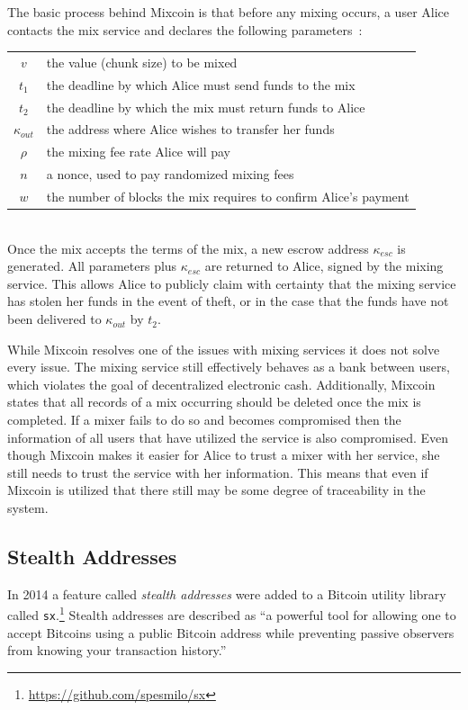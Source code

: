 \documentclass[11pt]{article}
\begin{document}
The basic process behind Mixcoin is that before any mixing occurs, a user Alice contacts the mix service and declares
the following parameters~\cite{bonneau14}:\\
\begin{tabular}{cl}
    $v$ & the value (chunk size) to be mixed\\
    $t_1$ & the deadline by which Alice must send funds to the mix\\
    $t_2$ & the deadline by which the mix must return funds to Alice\\
    $\kappa_{out}$ & the address where Alice wishes to transfer her funds\\
    $\rho$ & the mixing fee rate Alice will pay\\
    $n$ & a nonce, used to pay randomized mixing fees\\
    $w$ & the number of blocks the mix requires to confirm Alice's payment
\end{tabular}
\vspace{1em}\\ 
Once the mix accepts the terms of the mix, a new escrow address $\kappa_{esc}$ is generated. All parameters plus
$\kappa_{esc}$ are returned to Alice, signed by the mixing service. This allows Alice to publicly claim with certainty
that the mixing service has stolen her funds in the event of theft, or in the case that the funds have not been
delivered to $\kappa_{out}$ by $t_2$.

While Mixcoin resolves one of the issues with mixing services it does not solve every issue. The mixing service
still effectively behaves as a bank between users, which violates the goal of decentralized electronic cash.
Additionally, Mixcoin states that all records of a mix occurring should be deleted once the mix is completed. If
a mixer fails to do so and becomes compromised then the information of all users that have utilized the service
is also compromised.  Even though Mixcoin makes it easier for Alice to trust a mixer with her service, she still
needs to trust the service with her information. This means that even if Mixcoin is utilized that there still
may be some degree of traceability in the system.

\subsection{Stealth Addresses}
In 2014 a feature called \emph{stealth addresses} were added to a Bitcoin utility library called
\texttt{sx}.\footnote{\url{https://github.com/spesmilo/sx}} Stealth addresses are described as ``a powerful tool for
allowing one to accept Bitcoins using a public Bitcoin address while preventing passive observers from knowing your
transaction history.''\cite{stealth}
\end{document}
